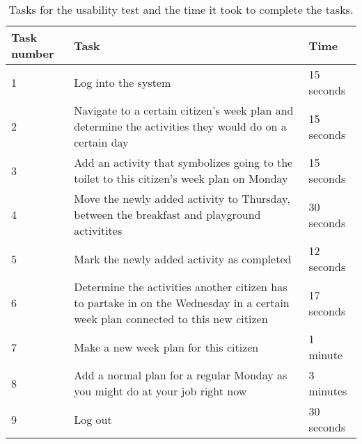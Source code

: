 \begin{table}[H]
    \small
    \begin{tabular}{|p{1.3cm}|p{10cm}|p{1.8cm}|}
    \hline
    Task number      &Task                                                                                                                & Time      \\ \hline
    1 & Log into the system                                                                                                               & 15 seconds  \\ \hline
    2 & Navigate to a certain citizen's week plan and determine the activities they would do on a certain day                              & 15 seconds  \\ \hline
    3 & Add an activity that symbolizes going to the toilet to this citizen's week plan on Monday                                          &  15 seconds \\ \hline
    4 & Move the newly added activity to Thursday, between the breakfast and playground activitites                                        & 30 seconds   \\ \hline
    5 & Mark the newly added activity as completed                                                                                            & 12 seconds   \\ \hline
    6 & Determine the activities another citizen has to partake in on the Wednesday in a certain week plan connected to this new citizen     & 17 seconds   \\ \hline
    7 & Make a new week plan for this citizen                                                                                                & 1 minute   \\ \hline
    8 & Add a normal plan for a regular Monday as you might do at your job right now                                                          & 3 minutes   \\ \hline
    9 & Log out                                                                                                                              & 30 seconds   \\ \hline
    \end{tabular}
    \caption{Tasks for the usability test and the time it took to complete the tasks.}\label{table:usability_tasks}
\end{table}

